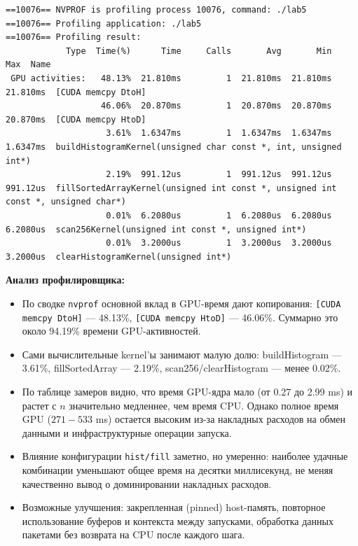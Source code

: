 \documentclass[a4paper,14pt]{extarticle}
\begin{document}
\begin{lstlisting}[basicstyle=\ttfamily\scriptsize,frame=single,breaklines=true]
==10076== NVPROF is profiling process 10076, command: ./lab5
==10076== Profiling application: ./lab5
==10076== Profiling result:
            Type  Time(%)      Time     Calls       Avg       Min       Max  Name
 GPU activities:   48.13%  21.810ms         1  21.810ms  21.810ms  21.810ms  [CUDA memcpy DtoH]
                   46.06%  20.870ms         1  20.870ms  20.870ms  20.870ms  [CUDA memcpy HtoD]
                    3.61%  1.6347ms         1  1.6347ms  1.6347ms  1.6347ms  buildHistogramKernel(unsigned char const *, int, unsigned int*)
                    2.19%  991.12us         1  991.12us  991.12us  991.12us  fillSortedArrayKernel(unsigned int const *, unsigned int const *, unsigned char*)
                    0.01%  6.2080us         1  6.2080us  6.2080us  6.2080us  scan256Kernel(unsigned int const *, unsigned int*)
                    0.01%  3.2000us         1  3.2000us  3.2000us  3.2000us  clearHistogramKernel(unsigned int*)
\end{lstlisting}

\textbf{Анализ профилировщика:}
\begin{itemize}
    \item По сводке \texttt{nvprof} основной вклад в GPU-время дают копирования:
    \texttt{[CUDA memcpy DtoH]} --- 48.13\%, \texttt{[CUDA memcpy HtoD]} --- 46.06\%.
    Суммарно это около 94.19\% времени GPU-активностей.
    \item Сами вычислительные kernel'ы занимают малую долю:
    buildHistogram --- 3.61\%,
    fillSortedArray --- 2.19\%,
    scan256/clearHistogram --- менее 0.02\%.
    \item По таблице замеров видно, что время GPU-ядра мало
    (от 0.27 до 2.99 ms) и растет с \(n\) значительно медленнее, чем время CPU.
    Однако полное время GPU (\(271\!-\!533\) ms) остается высоким из-за накладных
    расходов на обмен данными и инфраструктурные операции запуска.
    \item Влияние конфигурации \texttt{hist/fill} заметно, но умеренно:
    наиболее удачные комбинации уменьшают общее время на десятки миллисекунд,
    не меняя качественно вывод о доминировании накладных расходов.
    \item Возможные улучшения: закрепленная (pinned) host-память, повторное
    использование буферов и контекста между запусками, обработка данных
    пакетами без возврата на CPU после каждого шага.
\end{itemize}
\end{document}
